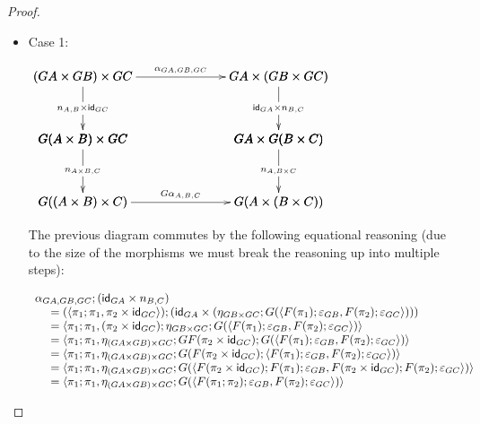 \begin{proof}
  \begin{itemize}
  \item[] Case 1:
    \begin{center}
      \begin{math}
        \bfig
        \vSquares|ammmmma|/->`->`->``->`->`->/[
          (GA \times GB) \times GC`
          GA \times (GB \times GC)`
          G(A \times B) \times GC`
          GA \times G(B \times C)`
          G((A \times B) \times C)`
          G(A \times (B \times C));
          {\alpha}_{GA,GB,GC}`
          n_{A,B} \times \id_{GC}`
          \id_{GA} \times n_{B,C}``
          n_{A \times B,C}`
          n_{A,B \times C}`
          G{\alpha}_{A,B,C}]
        \efig
      \end{math}
    \end{center}
    The previous diagram commutes by the following equational
    reasoning (due to the size of the morphisms we must break the
    reasoning up into multiple steps):
    \begin{center}
      \footnotesize
      \begin{math}
        \begin{array}{lll}
          \alpha_{GA,GB,GC};(\mathsf{id}_{GA} \times n_{B,C})\\
          \,\,\,\,\,\,\,\,= (\langle \pi_1;\pi_1, \pi_2 \times \mathsf{id}_{GC} \rangle);(\mathsf{id}_{GA} \times (\eta_{GB \times GC};G(\langle F(\pi_1);\varepsilon_{GB}, F(\pi_2);\varepsilon_{GC} \rangle)))\\
          \,\,\,\,\,\,\,\,=\langle \pi_1;\pi_1,  (\pi_2 \times \mathsf{id}_{GC});\eta_{GB \times GC};G(\langle F(\pi_1);\varepsilon_{GB}, F(\pi_2);\varepsilon_{GC} \rangle)\rangle\\
          \,\,\,\,\,\,\,\,=\langle \pi_1;\pi_1,  \eta_{(GA \times GB) \times GC};GF(\pi_2 \times \mathsf{id}_{GC});G(\langle F(\pi_1);\varepsilon_{GB}, F(\pi_2);\varepsilon_{GC} \rangle)\rangle\\
          \,\,\,\,\,\,\,\,=\langle \pi_1;\pi_1,  \eta_{(GA \times GB) \times GC};G(F(\pi_2 \times \mathsf{id}_{GC});\langle F(\pi_1);\varepsilon_{GB}, F(\pi_2);\varepsilon_{GC} \rangle)\rangle\\
          \,\,\,\,\,\,\,\,=\langle \pi_1;\pi_1,  \eta_{(GA \times GB) \times GC};G(\langle F(\pi_2 \times \mathsf{id}_{GC});F(\pi_1);\varepsilon_{GB}, F(\pi_2 \times \mathsf{id}_{GC});F(\pi_2);\varepsilon_{GC} \rangle)\rangle\\
          \,\,\,\,\,\,\,\,=\langle \pi_1;\pi_1,  \eta_{(GA \times GB) \times GC};G(\langle F(\pi_1;\pi_2);\varepsilon_{GB}, F(\pi_2);\varepsilon_{GC} \rangle)\rangle\\
        \end{array}
      \end{math}
    \end{center}


\end{itemize}
\end{proof}
